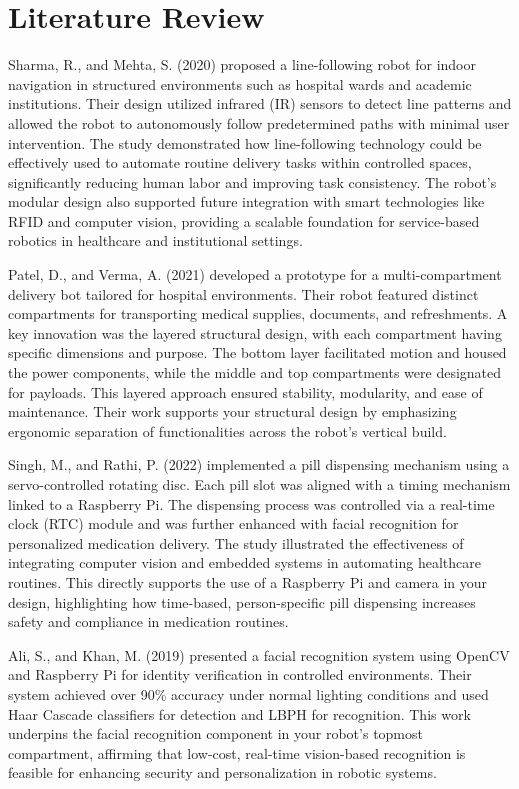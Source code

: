 
\section{Literature Review}

Sharma, R., and Mehta, S. (2020) proposed a line-following robot for indoor navigation in structured environments such as hospital wards and academic institutions. Their design utilized infrared (IR) sensors to detect line patterns and allowed the robot to autonomously follow predetermined paths with minimal user intervention. The study demonstrated how line-following technology could be effectively used to automate routine delivery tasks within controlled spaces, significantly reducing human labor and improving task consistency. The robot’s modular design also supported future integration with smart technologies like RFID and computer vision, providing a scalable foundation for service-based robotics in healthcare and institutional settings.

Patel, D., and Verma, A. (2021) developed a prototype for a multi-compartment delivery bot tailored for hospital environments. Their robot featured distinct compartments for transporting medical supplies, documents, and refreshments. A key innovation was the layered structural design, with each compartment having specific dimensions and purpose. The bottom layer facilitated motion and housed the power components, while the middle and top compartments were designated for payloads. This layered approach ensured stability, modularity, and ease of maintenance. Their work supports your structural design by emphasizing ergonomic separation of functionalities across the robot’s vertical build.

Singh, M., and Rathi, P. (2022) implemented a pill dispensing mechanism using a servo-controlled rotating disc. Each pill slot was aligned with a timing mechanism linked to a Raspberry Pi. The dispensing process was controlled via a real-time clock (RTC) module and was further enhanced with facial recognition for personalized medication delivery. The study illustrated the effectiveness of integrating computer vision and embedded systems in automating healthcare routines. This directly supports the use of a Raspberry Pi and camera in your design, highlighting how time-based, person-specific pill dispensing increases safety and compliance in medication routines.

Ali, S., and Khan, M. (2019) presented a facial recognition system using OpenCV and Raspberry Pi for identity verification in controlled environments. Their system achieved over 90\% accuracy under normal lighting conditions and used Haar Cascade classifiers for detection and LBPH for recognition. This work underpins the facial recognition component in your robot’s topmost compartment, affirming that low-cost, real-time vision-based recognition is feasible for enhancing security and personalization in robotic systems.


